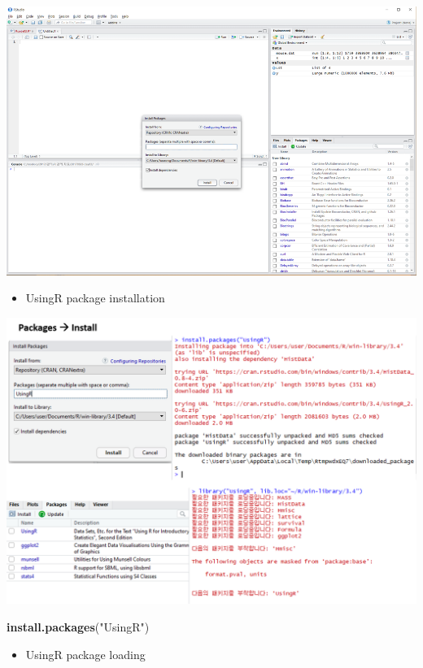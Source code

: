 \documentclass[
]{book}
\newenvironment{Shaded}{\begin{snugshade}}{\end{snugshade}}
\newcommand{\KeywordTok}[1]{\textcolor[rgb]{0.13,0.29,0.53}{\textbf{#1}}}
\newcommand{\NormalTok}[1]{#1}
\newcommand{\StringTok}[1]{\textcolor[rgb]{0.31,0.60,0.02}{#1}}
\providecommand{\tightlist}{%
  \setlength{\itemsep}{0pt}\setlength{\parskip}{0pt}}
\begin{document}
\includegraphics{images/01/01-18.png}

\begin{itemize}
\tightlist
\item
  UsingR package installation
\end{itemize}

\includegraphics{images/01/01-19.png}

\begin{Shaded}
\begin{Highlighting}[]
\KeywordTok{install.packages}\NormalTok{(}\StringTok{"UsingR"}\NormalTok{)}
\end{Highlighting}
\end{Shaded}

\begin{itemize}
\tightlist
\item
  UsingR package loading
\end{itemize}
\end{document}
